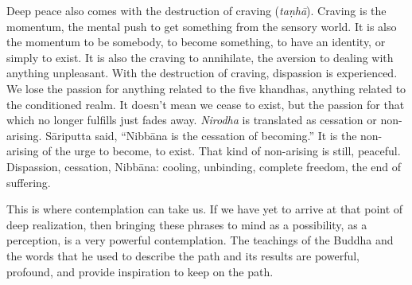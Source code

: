 Deep peace also comes with the destruction of craving (\emph{taṇhā}). Craving is the momentum, the mental push to get something from the sensory world. It is also the momentum to be somebody, to become something, to have an identity, or simply to exist. It is also the craving to annihilate, the aversion to dealing with anything unpleasant. With the destruction of craving, dispassion is experienced. We lose the passion for anything related to the five khandhas, anything related to the conditioned realm. It doesn't mean we cease to exist, but the passion for that which no longer fulfills just fades away. \emph{Nirodha} is translated as cessation or non-arising. Sāriputta said, ``Nibbāna is the cessation of becoming.'' It is the non-arising of the urge to become, to exist. That kind of non-arising is still, peaceful. Dispassion, cessation, Nibbāna: cooling, unbinding, complete freedom, the end of suffering.

This is where contemplation can take us. If we have yet to arrive at that point of deep realization, then bringing these phrases to mind as a possibility, as a perception, is a very powerful contemplation. The teachings of the Buddha and the words that he used to describe the path and its results are powerful, profound, and provide inspiration to keep on the path.
